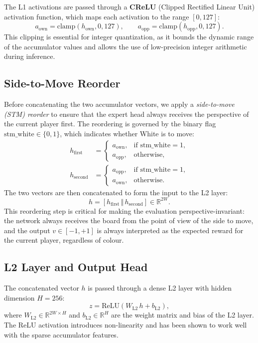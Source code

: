 The L1 activations are passed through a \textbf{CReLU} (Clipped Rectified Linear Unit) activation function, which maps each activation to the range \([0, 127]\):
\[
a_{\mathrm{own}} = \mathrm{clamp}(h_{\mathrm{own}}, 0, 127), \qquad
a_{\mathrm{opp}} = \mathrm{clamp}(h_{\mathrm{opp}}, 0, 127).
\]
This clipping is essential for integer quantization, as it bounds the dynamic range of the accumulator values and allows the use of low-precision integer arithmetic during inference.

\subsection{Side-to-Move Reorder}\label{sec:stm-reorder}

Before concatenating the two accumulator vectors, we apply a \emph{side-to-move (STM) reorder} to ensure that the expert head always receives the perspective of the current player first. The reordering is governed by the binary flag \(\mathrm{stm\_white} \in \{0,1\}\), which indicates whether White is to move:
\begin{align*}
h_{\mathrm{first}} &=
\begin{cases}
a_{\mathrm{own}}, & \text{if } \mathrm{stm\_white} = 1, \\
a_{\mathrm{opp}}, & \text{otherwise},
\end{cases}
\\
h_{\mathrm{second}} &=
\begin{cases}
a_{\mathrm{opp}}, & \text{if } \mathrm{stm\_white} = 1, \\
a_{\mathrm{own}}, & \text{otherwise}.
\end{cases}
\end{align*}
The two vectors are then concatenated to form the input to the L2 layer:
\[
h = [h_{\mathrm{first}} \, \Vert \, h_{\mathrm{second}}] \in \mathbb{R}^{2W}.
\]
This reordering step is critical for making the evaluation perspective-invariant: the network always receives the board from the point of view of the side to move, and the output \(v \in [-1, +1]\) is always interpreted as the expected reward for the current player, regardless of colour.

\subsection{L2 Layer and Output Head}\label{sec:l2-head}

The concatenated vector \(h\) is passed through a dense L2 layer with hidden dimension \(H = 256\):
\[
z = \mathrm{ReLU}(W_{\mathrm{L2}} \, h + b_{\mathrm{L2}}),
\]
where \(W_{\mathrm{L2}} \in \mathbb{R}^{2W \times H}\) and \(b_{\mathrm{L2}} \in \mathbb{R}^{H}\) are the weight matrix and bias of the L2 layer. The ReLU activation introduces non-linearity and has been shown to work well with the sparse accumulator features.

